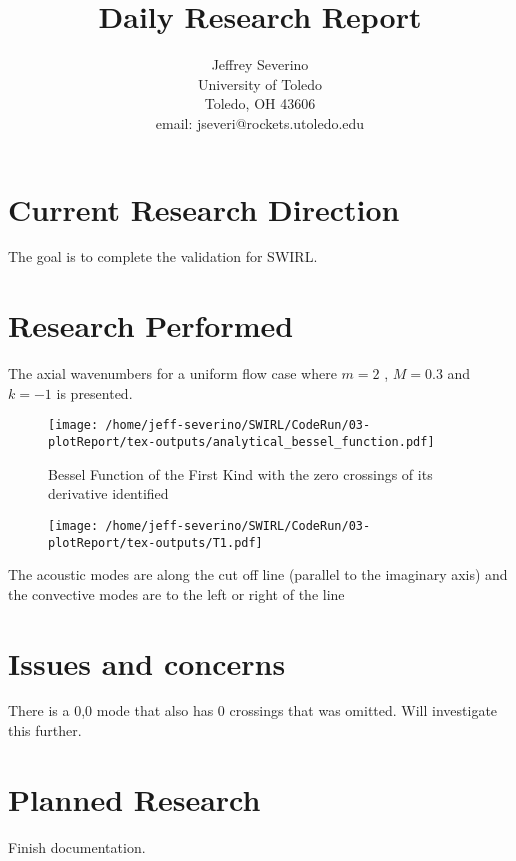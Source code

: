 \documentclass[a4paper]{article}
\begin{document}
\begin{titlepage}

    \title{
    Daily Research Report}

    \author{ Jeffrey Severino \\
        University of Toledo \\
        Toledo, OH  43606 \\
    email: jseveri@rockets.utoledo.edu}


    \maketitle

\end{titlepage}
\section{Current Research Direction}
The goal is to complete the validation for SWIRL.
\section{Research Performed}

The axial wavenumbers for a uniform flow case where $m = 2$ , $M = 0.3$ and 
$k = -1$ is presented. 
 \begin{figure}
     \centering
     \texttt{[image: /home/jeff-severino/SWIRL/CodeRun/03-plotReport/tex-outputs/analytical\_bessel\_function.pdf]}
     \caption{Bessel Function of the First Kind with the zero crossings of its
     derivative identified}
 \end{figure}

 \begin{figure}[h!]
     \centering
     \texttt{[image: /home/jeff-severino/SWIRL/CodeRun/03-plotReport/tex-outputs/T1.pdf]}
 \end{figure}

 The acoustic modes are along the cut off line (parallel to the imaginary axis)
 and the convective modes are to the left or right of the line
\section{Issues and concerns}
There is a 0,0 mode that also has 0 crossings that was omitted. Will investigate
this further.
\section{Planned Research}
Finish documentation.
\end{document}
